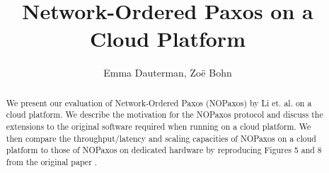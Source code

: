 \documentclass[sigconf]{acmart}
\begin{document}
\title{Network-Ordered Paxos on a Cloud Platform}


\author{Emma Dauterman, Zo{\"e} Bohn}

\renewcommand{\shortauthors}{Dauterman, Bohn}

\begin{abstract}
We present our evaluation of Network-Ordered Paxos \cite{nopaxos} (NOPaxos) by Li et. al. on a cloud platform. We describe the motivation for the NOPaxos protocol and discuss the extensions to the original software required when running on a cloud platform. We then compare the throughput/latency and scaling capacities of NOPaxos on a cloud platform to those of NOPaxos on dedicated hardware by reproducing Figures 5 and 8 from the original paper \cite{nopaxos}. 
\end{abstract}

\maketitle











\end{document}
